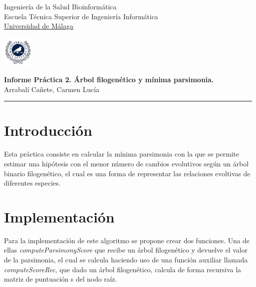 \documentclass[11pt,letterpaper]{article}
\begin{document}

\usetikzlibrary{positioning}
\pagestyle{plain}
\begin{flushleft}
Ingeniería de la Salud \hfill Bioinformática\\
Escuela Técnica Superior de Ingeniería Informática\\
\underline{Universidad de Málaga}
\end{flushleft}

\begin{flushright}\vspace{-5mm}
\includegraphics[height=1.5cm]{escudo.jpg}
\end{flushright}

\begin{center}\vspace{-1cm}
\textbf{\large Informe Práctica 2. Árbol filogenético y mínima parsimonia.}\\   %
Arrabalí Cañete, Carmen Lucía\\                         %
\end{center}
\rule{\linewidth}{0.1mm}


\section{Introducción}

Esta práctica consiste en calcular la mínima parsimonia con la que se permite estimar una hipótesis con el menor número de cambios evolutivos según un árbol binario filogenético, el cual es una forma de representar las relaciones evoltivas de diferentes especies.


\section{Implementación}

Para la implementación de este algoritmo se propone crear dos funciones. Una de ellas \textit{computeParsimonyScore} que recibe un árbol filogenético y devuelve el valor de la parsimonia, el cual se calcula haciendo uso de una función auxiliar llamada \textit{computeScoreRec}, que dado un árbol filogenético, calcula de forma recursiva la matriz de puntuación s del nodo raíz. 
\end{document}
